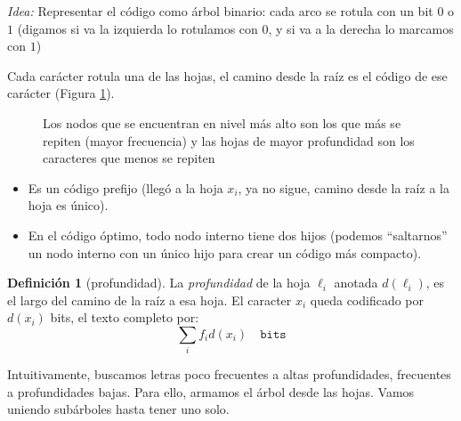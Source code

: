 \documentclass[english, spanish, fleqn, 10pt]{article}
\newcommand{\comillas}[1]{``#1''}
\numberwithin{equation}{section}
\newcommand{\nparentesis}[1]{\left( #1 \right)}
\theoremstyle{definition}
\newtheorem{definition}{Definición}[section]
\begin{document}
\noindent\emph{Idea:} Representar el código como árbol binario: cada arco se rotula con un bit $0$ o $1$ (digamos si va la izquierda lo rotulamos con $0$, y si va a la derecha lo marcamos con $1$)

Cada carácter rotula una de las hojas, el camino desde la raíz es el código de ese carácter (Figura \ref{09::EjemploArbolHuffman}).
\begin{figure}[!h]
	\centering
	\caption{Los nodos que se encuentran en nivel más alto son los que más se repiten (mayor frecuencia) y las hojas de mayor profundidad son los caracteres que menos se repiten}
	\label{09::EjemploArbolHuffman}
\end{figure}

\begin{itemize}
	\item Es un código prefijo (llegó a la hoja $x_i$, ya no sigue, camino desde la raíz a la hoja es único).
	
	\item En el código óptimo, todo nodo interno tiene dos hijos (podemos \comillas{saltarnos} un nodo interno con un único hijo para crear un código más compacto).
\end{itemize}

\begin{definition}[profundidad]
	La \emph{profundidad} de la hoja $\ell _i$ anotada $d\nparentesis{\ell _i}$, es el largo del camino de la raíz a esa hoja. El caracter $x_i$ queda codificado por $d\nparentesis{x_i}$ bits, el texto completo por:
	\begin{equation*}
	\sum_{i}f_id\nparentesis{x_i}\quad \mathtt{bits}
	\end{equation*}
\end{definition}
Intuitivamente, buscamos letras poco frecuentes a altas profundidades, frecuentes a profundidades bajas. Para ello, armamos el árbol desde las hojas. Vamos uniendo subárboles hasta tener uno solo.
\end{document}
